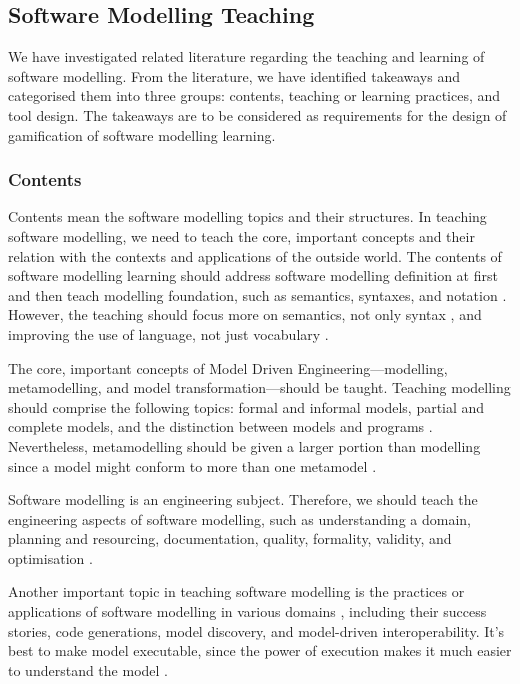 \documentclass[12pt, a4paper]{report}
\begin{document}
{\subsection{Software Modelling Teaching}
\label{Software Modelling Teaching}
We have investigated related literature regarding the teaching and learning of software modelling. From the literature, we have identified takeaways and categorised them into three groups: contents, teaching or learning practices, and tool design. The takeaways are to be considered as requirements for the design of gamification of software modelling learning. 

\subsubsection{Contents}
Contents mean the software modelling topics and their structures. In teaching software modelling, we need to teach the core, important concepts and their relation with the contexts and applications of the outside world. The contents of software modelling learning should address software modelling definition at first \cite{borstler2012teaching} and then teach modelling foundation, such as semantics, syntaxes, and notation \cite{borstler2012teaching}. However, the teaching should focus more on semantics, not only syntax \cite{borstler2012teaching}, and improving the use of language, not just vocabulary \cite{bezivin2009teaching}. 

The core, important concepts of Model Driven Engineering---modelling, metamodelling, and model transformation---should be taught. Teaching modelling should comprise the following topics: formal and informal models, partial and complete models, and the distinction between models and programs \cite{bezivin2009teaching}. Nevertheless, metamodelling should be given a larger portion than modelling since a model might conform to more than one metamodel \cite{ober2007teaching}. 

Software modelling is an engineering subject. Therefore, we should teach the engineering aspects of software modelling, such as  understanding a domain, planning and resourcing, documentation, quality, formality, validity, and optimisation \cite{paige2014bad}.

Another important topic in teaching software modelling is the practices or applications of software modelling in various domains \cite{ borstler2012teaching, paige2014bad}, including their success stories, code generations, model discovery, and model-driven interoperability. It's best to make model executable, since the power of execution makes it much easier to understand the model \cite{bezivin2009teaching}.

}
\end{document}
